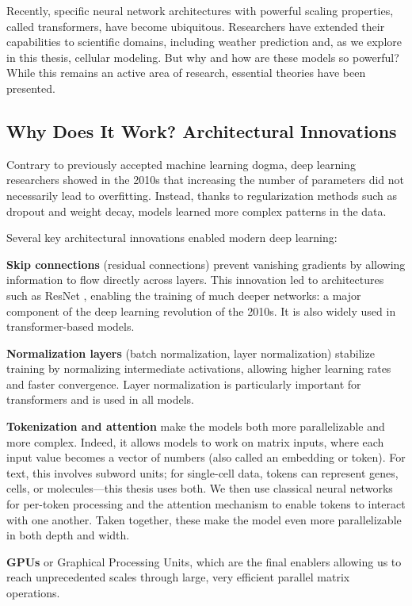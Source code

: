 Recently, specific neural network architectures with powerful scaling properties, called transformers, have become ubiquitous. Researchers have extended their capabilities to scientific domains, including weather prediction \cite{lamLearningSkillfulMediumrange2023} and, as we explore in this thesis, cellular modeling. But why and how are these models so powerful? While this remains an active area of research, essential theories have been presented.

\subsection{Why Does It Work? Architectural Innovations}
Contrary to previously accepted machine learning dogma, deep learning researchers showed in the 2010s that increasing the number of parameters did not necessarily lead to overfitting. Instead, thanks to regularization methods such as dropout and weight decay, models learned more complex patterns in the data.

Several key architectural innovations enabled modern deep learning:

\textbf{Skip connections} (residual connections) prevent vanishing gradients by allowing information to flow directly across layers. This innovation led to architectures such as ResNet \cite{heDeepResidualLearning2015}, enabling the training of much deeper networks: a major component of the deep learning revolution of the 2010s. It is also widely used in transformer-based models.

\textbf{Normalization layers} (batch normalization, layer normalization) stabilize training by normalizing intermediate activations, allowing higher learning rates and faster convergence. Layer normalization is particularly important for transformers and is used in all models.

\textbf{Tokenization and attention} make the models both more parallelizable and more complex. Indeed, it allows models to work on matrix inputs, where each input value becomes a vector of numbers (also called an embedding or token). For text, this involves subword units; for single-cell data, tokens can represent genes, cells, or molecules---this thesis uses both.
We then use classical neural networks for per-token processing and the attention mechanism to enable tokens to interact with one another.
Taken together, these make the model even more parallelizable in both depth and width.

\textbf{\gls{GPU}s} or Graphical Processing Units, which are the final enablers allowing us to reach unprecedented scales through large, very efficient parallel matrix operations.

